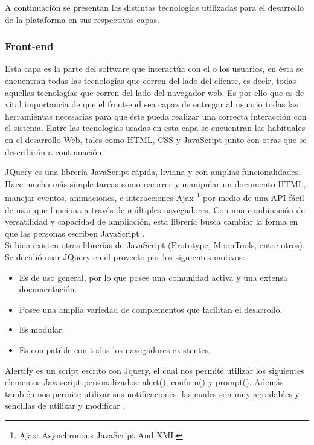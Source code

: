 A continuación se presentan las distintas tecnologías utilizadas para el desarrollo de la plataforma en sus respectivas capas.
\subsubsection{Front-end}

Esta capa es la parte del software que interactúa con el o los usuarios, en ésta  se encuentran todas las tecnologías que corren del lado del cliente, es decir, todas aquellas tecnologías que corren del lado del navegador web. Es por ello que es de vital importancia de que el front-end sea capaz de entregar  al usuario todas las herramientas necesarias para que éste pueda realizar una correcta interacción con el sistema. Entre las tecnologías usadas en esta capa se encuentran las habituales en el desarrollo Web, tales como HTML, CSS y JavaScript junto con otras que se describirán a continuación.


JQuery es una librería JavaScript rápida, liviana y con amplias funcionalidades. Hace mucho más simple tareas como recorrer y manipular un documento HTML, manejar eventos, animaciones, e interacciones Ajax	\footnote{Ajax: Asynchronous JavaScript And XML} por medio de una API fácil de usar que funciona a través de múltiples navegadores. Con una combinación de versatilidad y capacidad de ampliación, esta librería busca cambiar la forma en que las personas escriben JavaScript \cite{JQu15}.
\\

Si bien existen otras librerías de JavaScript (Prototype, MoonTools, entre otros). Se decidió usar JQuery en el proyecto por los siguientes motivos:
\begin{itemize}
	\item Es de uso general, por lo que posee una comunidad activa y una extensa documentación.
	\item Posee una amplia variedad de complementos que facilitan el desarrollo.
	\item Es modular.
	\item Es compatible con todos los navegadores existentes.
\end{itemize}



Alertify es un script escrito con Jquery, el cual nos permite utilizar los siguientes elementos Javascript personalizados: alert(), confirm() y prompt(). Además también nos permite utilizar sus notificaciones, las cuales son muy agradables y sencillas de utilizar y modificar \cite{ALE15}.
\\

